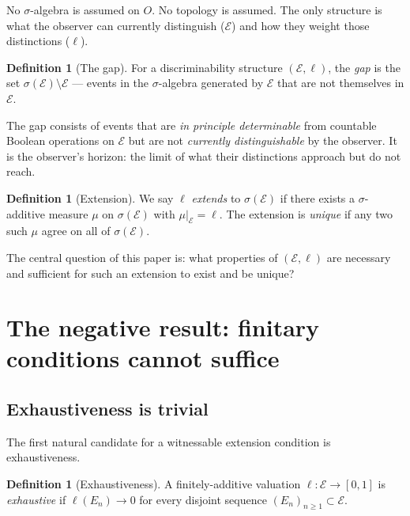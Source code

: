 \documentclass[12pt]{article}
\theoremstyle{definition}
\newtheorem{definition}[theorem]{Definition}
\theoremstyle{remark}
\newcommand{\E}{\mathcal{E}}
\newcommand{\sigE}{\sigma(\mathcal{E})}
\begin{document}
\noindent No $\sigma$-algebra is assumed on $O$.  No topology is assumed.  The only
structure is what the observer can currently distinguish ($\E$) and how they weight
those distinctions ($\ell$).

\begin{definition}[The gap]
\label{def:gap}
For a discriminability structure $(\E, \ell)$, the \emph{gap} is the set
$\sigE \setminus \E$ --- events in the $\sigma$-algebra generated by $\E$ that are
not themselves in $\E$.
\end{definition}

\noindent The gap consists of events that are \emph{in principle determinable} from
countable Boolean operations on $\E$ but are not \emph{currently distinguishable} by
the observer.  It is the observer's horizon: the limit of what their distinctions
approach but do not reach.

\begin{definition}[Extension]
We say $\ell$ \emph{extends} to $\sigE$ if there exists a $\sigma$-additive measure
$\mu$ on $\sigE$ with $\mu|_\E = \ell$.  The extension is \emph{unique} if any two
such $\mu$ agree on all of $\sigE$.
\end{definition}

\noindent The central question of this paper is: what properties of $(\E, \ell)$ are
necessary and sufficient for such an extension to exist and be unique?

\section{The negative result: finitary conditions cannot suffice}
\label{sec:negative}

\subsection{Exhaustiveness is trivial}

The first natural candidate for a witnessable extension condition is exhaustiveness.

\begin{definition}[Exhaustiveness]
A finitely-additive valuation $\ell : \E \to [0,1]$ is \emph{exhaustive} if
$\ell(E_n) \to 0$ for every disjoint sequence $(E_n)_{n \geq 1} \subset \E$.
\end{definition}
\end{document}
